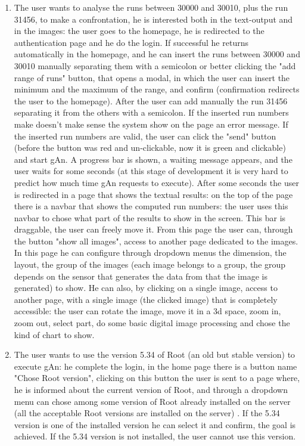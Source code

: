 \begin{enumerate}

\item The user wants to analyse the runs between 30000 and 30010, plus the run 31456, to make a confrontation, he is interested both in the text-output and in the images: 
the user goes to the homepage, he is redirected to the authentication page and he do the login. If successful he returns automatically in the homepage, and he can insert the runs between 30000 and 30010 manually separating them with a semicolon or better clicking the "add range of runs" button, that opens a modal, in which the user can insert the minimum and the maximum of the range, and confirm (confirmation redirects the user to the homepage). After the user can add manually the run 31456 separating it from the others with a semicolon. If the inserted run numbers make doesn't make sense the system show on the page an error message. If the inserted run numbers are valid, the user can click the "send" button (before the button was red and un-clickable, now it is green and clickable) and start gAn. A progress bar is shown, a waiting message appears, and the user waits for some seconds (at this stage of development it is very hard to predict how much time gAn requests to execute). After some seconds the user is redirected in a page that shows the textual results: on the top of the page there is a navbar that shows the computed run numbers: the user uses this navbar to chose what part of the results to show in the screen. This bar is draggable, the user can freely move it. From this page the user can, through the button "show all images", access to another page dedicated to the images. In this page he can configure through dropdown menus the dimension, the layout, the group of the images (each image belongs to a group, the group depends on the sensor that generates the data from that the image is generated) to show. He can also, by clicking on a single image, access to another page, with a single image (the clicked image) that is completely accessible: the user can rotate the image, move it in a 3d space, zoom in, zoom out, select part, do some basic digital image processing and chose the kind of chart to show.   

\item The user wants to use the version 5.34 of Root (an old but stable version) to execute gAn: 
he complete the login, in the home page there is a button name "Chose Root version", clicking on this button the user is sent to a page where, he is informed about the current version of Root, and through a dropdown menu can chose among some version of Root already installed on the server (all the acceptable Root versions are installed on the server) . If the 5.34 version is one of the installed version he can select it and confirm, the goal is achieved. If the 5.34 version is not installed, the user cannot use this version.  


\end{enumerate}
